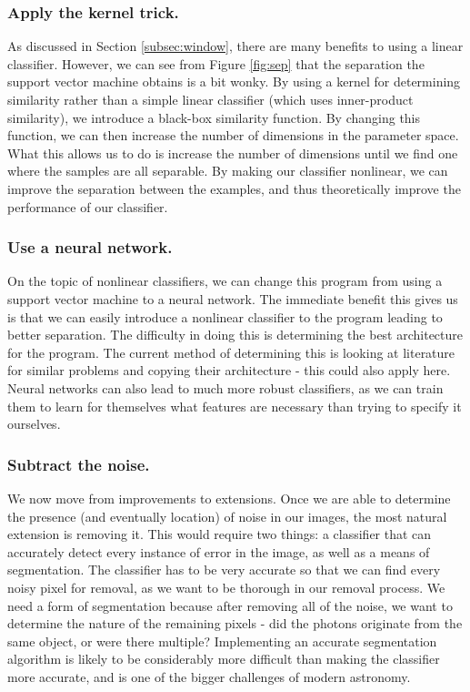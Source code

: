 \documentclass[twocolumn,longauthor]{aastex61}
\begin{document}
\subsubsection{Apply the kernel trick.} \label{subsubsec:kernel}
\noindent As discussed in Section \ref{subsec:window}, there are many benefits to using a linear classifier. However, we can see from Figure \ref{fig:sep} that the separation the support vector machine obtains is a bit wonky. By using a kernel for determining similarity rather than a simple linear classifier (which uses inner-product similarity), we introduce a black-box similarity function. By changing this function, we can then increase the number of dimensions in the parameter space. What this allows us to do is increase the number of dimensions until we find one where the samples are all separable. By making our classifier nonlinear, we can improve the separation between the examples, and thus theoretically improve the performance of our classifier.

\subsubsection{Use a neural network.} \label{subsubsec:nn}
\noindent On the topic of nonlinear classifiers, we can change this program from using a support vector machine to a neural network. The immediate benefit this gives us is that we can easily introduce a nonlinear classifier to the program leading to better separation. The difficulty in doing this is determining the best architecture for the program. The current method of determining this is looking at literature for similar problems and copying their architecture - this could also apply here. Neural networks can also lead to much more robust classifiers, as we can train them to learn for themselves what features are necessary than trying to specify it ourselves.

\subsubsection{Subtract the noise.} \label{subsubsec:subtract}
\noindent We now move from improvements to extensions. Once we are able to determine the presence (and eventually location) of noise in our images, the most natural extension is removing it. This would require two things: a classifier that can accurately detect every instance of error in the image, as well as a means of segmentation. The classifier has to be very accurate so that we can find every noisy pixel for removal, as we want to be thorough in our removal process. We need a form of segmentation because after removing all of the noise, we want to determine the nature of the remaining pixels - did the photons originate from the same object, or were there multiple? Implementing an accurate segmentation algorithm is likely to be considerably more difficult than making the classifier more accurate, and is one of the bigger challenges of modern astronomy.
\end{document}
